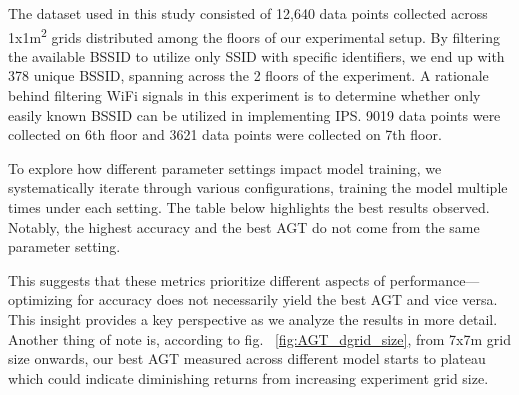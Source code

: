 \documentclass[runningheads]{llncs}
\begin{document}
The dataset used in this study consisted of 12,640 data points collected across 1x1m\textsuperscript{2} grids distributed among the floors of our experimental setup. By filtering the available BSSID to utilize only SSID with specific identifiers, we end up with 378 unique BSSID, spanning across the 2 floors of the experiment. A rationale behind filtering WiFi signals in this experiment is to determine whether only easily known BSSID can be utilized in implementing IPS. 9019 data points were collected on 6th floor and 3621 data points were collected on 7th floor.

To explore how different parameter settings impact model training, we systematically iterate through various configurations, training the model multiple times under each setting. The table below highlights the best results observed. Notably, the highest accuracy and the best AGT do not come from the same parameter setting.



This suggests that these metrics prioritize different aspects of performance—optimizing for accuracy does not necessarily yield the best AGT and vice versa. This insight provides a key perspective as we analyze the results in more detail. Another thing of note is, according to fig. ~\ref{fig:AGT_dgrid_size}, from 7x7m grid size onwards, our best AGT measured across different model starts to plateau which could indicate diminishing returns from increasing experiment grid size.
\end{document}
